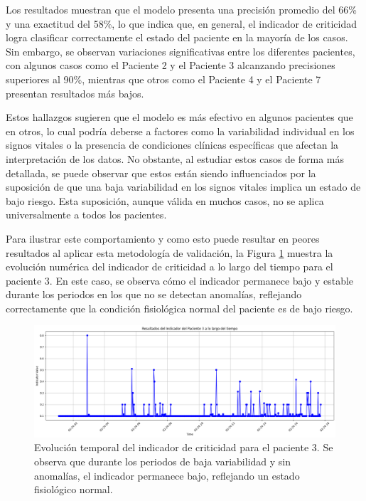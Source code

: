 Los resultados muestran que el modelo presenta una precisión promedio del 66\% y una exactitud del 58\%, lo que indica que, en general, el indicador de criticidad logra clasificar correctamente el estado del paciente en la mayoría de los casos. Sin embargo, se observan variaciones significativas entre los diferentes pacientes, con algunos casos como el Paciente 2 y el Paciente 3 alcanzando precisiones superiores al 90\%, mientras que otros como el Paciente 4 y el Paciente 7 presentan resultados más bajos.

Estos hallazgos sugieren que el modelo es más efectivo en algunos pacientes que en otros, lo cual podría deberse a factores como la variabilidad individual en los signos vitales o la presencia de condiciones clínicas específicas que afectan la interpretación de los datos. No obstante, al estudiar estos casos de forma más detallada, se puede observar que estos están siendo influenciados por la suposición de que una baja variabilidad en los signos vitales implica un estado de bajo riesgo. Esta suposición, aunque válida en muchos casos, no se aplica universalmente a todos los pacientes.

Para ilustrar este comportamiento y como esto puede resultar en peores resultados al aplicar esta metodología de validación, la Figura \ref{fig:indicador_tiempo_paciente3} muestra la evolución numérica del indicador de criticidad a lo largo del tiempo para el paciente 3. En este caso, se observa cómo el indicador permanece bajo y estable durante los periodos en los que no se detectan anomalías, reflejando correctamente que la condición fisiológica normal del paciente es de bajo riesgo.

\begin{figure}[H]
  \centering
  \includegraphics[width=\textwidth]{Images/indicador_de_criticidad_cambio.png}
  \caption{Evolución temporal del indicador de criticidad para el paciente 3. Se observa que durante los periodos de baja variabilidad y sin anomalías, el indicador permanece bajo, reflejando un estado fisiológico normal.}
  \label{fig:indicador_tiempo_paciente3}
\end{figure}

